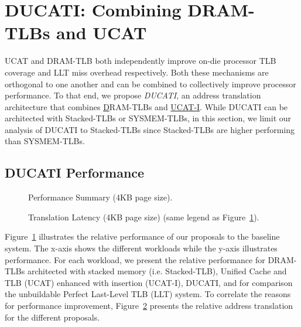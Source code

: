 \section{DUCATI: Combining DRAM-TLBs \newline and UCAT}
\label{sec:DUCATI}

\noindent UCAT and DRAM-TLB both independently improve on-die
processor TLB coverage and LLT miss overhead respectively. Both these
mechanisms are orthogonal to one another and can be combined to
collectively improve processor performance. To that end, we propose
{\em DUCATI}, an address translation architecture that combines
\underline{D}RAM-TLBs and \underline{UCAT-I}. While DUCATI can be
architected with Stacked-TLBs or SYSMEM-TLBs, in this section, we
limit our analysis of DUCATI to Stacked-TLBs since Stacked-TLBs are
higher performing than SYSMEM-TLBs.

\subsection{DUCATI Performance}

\begin{figure}[tp] 
\vspace{-0 in} \centering
\centerline{}

\caption{\small Performance Summary (4KB page size).\normalsize}
\label{fig:summary_4k_pages_perf} 
\vspace{0.1 in}
\end{figure}

\begin{figure}[tp] 
\vspace{0.1 in} \centering
\centerline{}

\caption{\small Translation Latency (4KB page size) (same legend as
  Figure~\ref{fig:summary_4k_pages_perf}).\normalsize}
\label{fig:summary_4k_pages_lat} 
\vspace{-0. in}
\end{figure}

\noindent Figure~\ref{fig:summary_4k_pages_perf} illustrates the
relative performance of our proposals to the baseline system. The
x-axis shows the different workloads while the y-axis illustrates
performance. For each workload, we present the relative performance
for DRAM-TLBs architected with stacked memory (i.e. Stacked-TLB),
Unified Cache and TLB (UCAT) enhanced with insertion (UCAT-I), DUCATI,
and for comparison the unbuildable Perfect Last-Level TLB (LLT)
system. To correlate the reasons for performance improvement,
Figure~\ref{fig:summary_4k_pages_lat} presents the relative address
translation for the different proposals.

